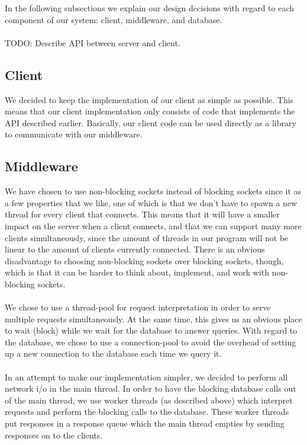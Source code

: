 \documentclass{article}
\begin{document}
        \noindent In the following subsections we explain our design decisions with regard to each component of our system: client, middleware, and database.\\
        \\
        TODO: Describe API between server and client.


        \subsection{Client}
            We decided to keep the implementation of our client as simple as possible. This means that our client implementation only consists of code that implements the API described earlier. Basically, our client code can be used directly as a library to communicate with our middleware.

        \subsection{Middleware}
            We have chosen to use non-blocking sockets instead of blocking sockets since it as a few properties that we like, one of which is that we don't have to spawn a new thread for every client that connects. This means that it will have a smaller impact on the server when a client connects, and that we can support many more clients simultaneously, since the amount of threads in our program will not be linear to the amount of clients currently connected. There is an obvious disadvantage to choosing non-blocking sockets over blocking sockets, though, which is that it can be harder to think about, implement, and work with non-blocking sockets.\\
            \\
            We chose to use a thread-pool for request interpretation in order to serve multiple requests simultaneously. At the same time, this gives us an obvious place to wait (block) while we wait for the database to answer queries. With regard to the database, we chose to use a connection-pool to avoid the overhead of setting up a new connection to the database each time we query it.\\
            \\
            In an attempt to make our implementation simpler, we decided to perform all network i/o in the main thread. In order to have the blocking database calls out of the main thread, we use worker threads (as described above) which interpret requests and perform the blocking calls to the database. These worker threads put responses in a response queue which the main thread empties by sending responses on to the clients.
\end{document}
